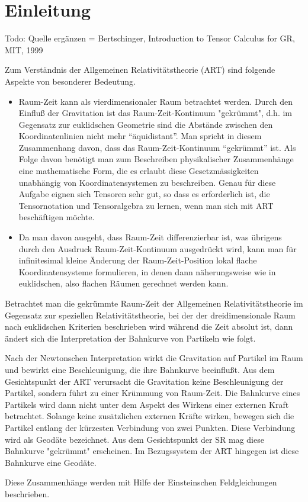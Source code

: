 
\section{Einleitung}

Todo: Quelle ergänzen = Bertschinger, Introduction to Tensor Calculus for GR, MIT, 1999

Zum Verständnis der Allgemeinen Relativitätstheorie (ART) sind folgende Aspekte von besonderer Bedeutung. 

\begin{itemize}
	\item Raum-Zeit kann als vierdimensionaler Raum betrachtet werden. Durch den Einfluß der Gravitation ist das Raum-Zeit-Kontinuum "gekrümmt", d.h. im Gegensatz zur euklidschen Geometrie sind die Abstände zwischen den Koordinatenlinien nicht mehr "`äquidistant"'. Man spricht in diesem Zusammenhang davon, dass das Raum-Zeit-Kontinuum "`gekrümmt"' ist. Als Folge davon benötigt man zum Beschreiben physikalischer Zusammenhänge eine mathematische Form, die es erlaubt diese Gesetzmässigkeiten unabhängig von Koordinatensystemen zu beschreiben. Genau für diese Aufgabe eignen sich Tensoren sehr gut, so dass es erforderlich ist, die Tensornotation und Tensoralgebra zu lernen, wenn man sich mit ART beschäftigen möchte.
	
	\item Da man davon ausgeht, dass Raum-Zeit differenzierbar ist, was übrigens durch den Ausdruck Raum-Zeit-Kontinuum ausgedrückt wird, kann man für infinitesimal kleine Änderung der Raum-Zeit-Position lokal flache Koordinatensysteme formulieren, in denen dann näherungsweise wie in euklidschen, also flachen Räumen gerechnet werden kann.
\end{itemize}

Betrachtet man die gekrümmte Raum-Zeit der Allgemeinen Relativitätstheorie im Gegensatz zur speziellen Relativitätstheorie, bei der der dreidimensionale Raum nach euklidschen Kriterien beschrieben wird während die Zeit absolut ist, dann ändert sich die Interpretation der Bahnkurve von Partikeln wie folgt.

Nach der Newtonschen Interpretation wirkt die Gravitation auf Partikel im Raum und bewirkt eine Beschleunigung, die ihre Bahnkurve beeinflußt. Aus dem Gesichtspunkt der ART verursacht die Gravitation keine Beschleunigung der Partikel, sondern führt zu einer Krümmung von Raum-Zeit. Die Bahnkurve eines Partikels wird dann nicht unter dem Aspekt des Wirkens einer externen Kraft betrachtet. Solange keine zusätzlichen externen Kräfte wirken, bewegen sich die Partikel entlang der kürzesten Verbindung von zwei Punkten. Diese Verbindung wird als Geodäte bezeichnet. Aus dem Gesichtspunkt der SR mag diese Bahnkurve "gekrümmt" erscheinen. Im Bezugssystem der ART hingegen ist diese Bahnkurve eine Geodäte. 

Diese Zusammenhänge werden mit Hilfe der Einsteinschen Feldgleichungen beschrieben.


